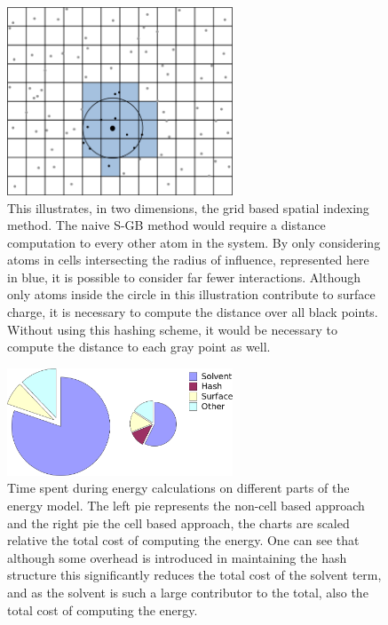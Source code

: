 \begin{figure}[h]
\begin{center}
\includegraphics[width=0.6\textwidth]{figures/grid4_crop.png}
\caption{This illustrates, in two dimensions, the grid based spatial indexing method.
The naive S-GB method would require a distance computation to every other atom in the system.
By only considering atoms in cells intersecting the radius of influence, represented here in blue, it is possible to consider far fewer interactions.
Although only atoms inside the circle in this illustration contribute to surface charge, it is necessary to compute the distance over all black points.
Without using this hashing scheme, it would be necessary to compute the distance to each gray point as well.}
\label{figure:grid_hash}
\end{center}
\end{figure}

\begin{figure}[h]
\begin{center}
\includegraphics[width=0.6\textwidth]{figures/side_by_side.png}
\caption{Time spent during energy calculations on different parts of the energy model.
The left pie represents the non-cell based approach and the right pie the cell based approach, the charts are scaled relative the total cost of computing the energy.
One can see that although some overhead is introduced in maintaining the hash structure this significantly reduces the total cost of the solvent term, and as the solvent is such a large contributor to the total, also the total cost of computing the energy.}
\label{fig:timing_pie}
\end{center}
\end{figure}
